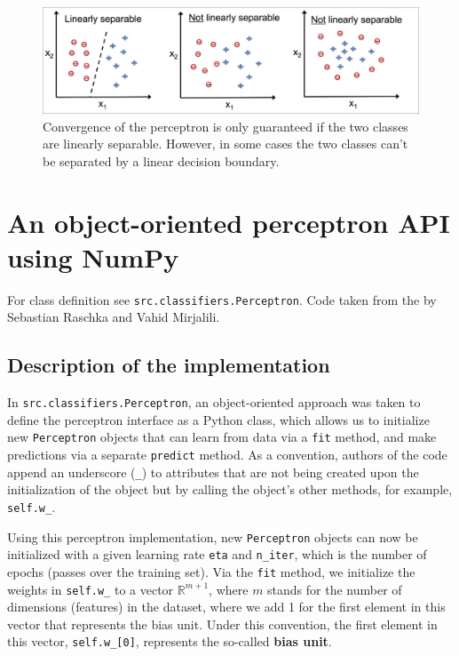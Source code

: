 \documentclass[11pt]{article}
\begin{document}
    \begin{figure}[hbt!]
        \centering
        \includegraphics[width=1\linewidth,trim=1 1 1 1,clip]{img/lin_nonlin.jpg}
        \caption{Convergence of the perceptron is only guaranteed if the two classes are linearly separable.
        However, in some cases the two classes can't be separated by a linear decision boundary.}
        \label{fig:lin_nonlin}
    \end{figure}

    \section{An object-oriented perceptron API using NumPy} \label{sec:perc_api}

    For class definition see \texttt{src.classifiers.Perceptron}.
    Code taken from the  by {Sebastian Raschka and Vahid Mirjalili}\cite{RaschkaMirjalili2017}.

    \subsection{Description of the implementation} \label{subsec:perc_impl}

    In \texttt{src.classifiers.Perceptron}, an object-oriented approach was taken to define the perceptron interface as a Python class, which allows us to initialize new \texttt{Perceptron} objects that can learn from data via a \texttt{fit} method, and make predictions via a separate \texttt{predict} method.
    As a convention, authors of the code\cite{RaschkaMirjalili2017} append an underscore (\texttt{\_}) to attributes that are not being created upon the initialization of the object but by calling the object's other methods, for example, \texttt{self.w\_}.

    Using this perceptron implementation, new \texttt{Perceptron} objects can now be initialized with a given learning rate \texttt{eta} and \texttt{n\_iter}, which is the number of epochs (passes over the training set).
    Via the \texttt{fit} method, we initialize the weights in \texttt{self.w\_} to a vector $\mathbb{R}^{m+1}$, where $m$ stands for the number of dimensions (features) in the dataset, where we add 1 for the first element in this vector that represents the bias unit.
    Under this convention, the first element in this vector, \texttt{self.w\_[0]}, represents the so-called \textbf{bias unit}.
\end{document}
